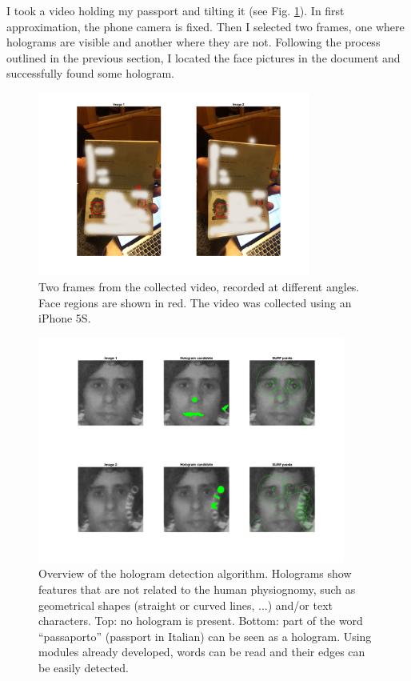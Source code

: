 \documentclass[a4paper]{article}
\begin{document}
I took a video holding my passport and tilting it (see Fig. \ref{fig:pics}). In first approximation, the phone camera is fixed. Then I selected two frames, one where holograms are visible and another where they are not. Following the process outlined in the previous section, I located the face pictures in the document and successfully found some hologram. 

\begin{figure}
    \centering
    \includegraphics[width=0.8\textwidth]{Angles.png}
    \caption{Two frames from the collected video, recorded at different angles. Face regions are shown in red. The video was collected using an iPhone 5S.}
    \label{fig:pics}
\end{figure}

\begin{figure}[h!]
    \centering
    \includegraphics[width=0.9\textwidth]{Detect.png}
    \caption{Overview of the hologram detection algorithm. Holograms show features that are not related to the human physiognomy, such as geometrical shapes (straight or curved lines, ...) and/or text characters. Top: no hologram is present. Bottom: part of the word ``passaporto'' (passport in Italian) can be seen as a hologram. Using  modules already developed, words can be read and their edges can be easily detected.}
    \label{fig:processing}
\end{figure}
\end{document}
